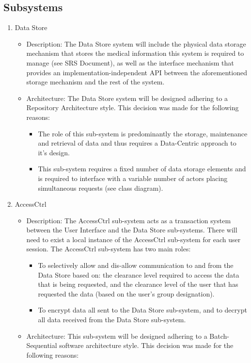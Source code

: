 \documentclass[12pt]{article}
\begin{document}
\subsection{Subsystems}
\begin{enumerate}
\item Data Store
\begin{itemize}
\item Description: The Data Store system will include the physical data storage mechanism that stores the medical information this system is required to manage (see SRS Document), as well as the interface mechanism that provides an implementation-independent API between the aforementioned storage mechanism and the rest of the system.
\item Architecture: The Data Store system will be designed adhering to a Repository Architecture style. This decision was made for the following reasons:
\begin{itemize}
\item The role of this sub-system is predominantly the storage, maintenance and retrieval of data and thus requires a Data-Centric approach to it's design.
\item This sub-system requires a fixed number of data storage elements and is required to interface with a variable number of actors placing simultaneous requests (see class diagram).
\end{itemize}
\end{itemize}
\item AccessCtrl
\begin{itemize}
\item Description: The AccessCtrl sub-system acts as a transaction system between the User Interface and the Data Store sub-systems. There will need to exist a local instance of the AccessCtrl sub-system for each user session. The AccessCtrl sub-system has two main roles:
\begin{itemize}
\item To selectively allow and dis-allow communication to and from the Data Store based on: the clearance level required to access the data that is being requested, and the clearance level of the user that has requested the data (based on the user's group designation).
\item To encrypt data all sent to the Data Store sub-system, and to decrypt all data received from the Data Store sub-system.
\end{itemize}
\item Architecture: This sub-system will be designed adhering to a Batch-Sequential software architecture style. This decision was made for the following reasons:

\end{itemize}
\end{enumerate}
\end{document}

